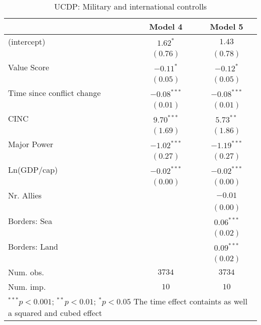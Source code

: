 
\begin{table}
\begin{center}
\begin{tabular}{l c c}
\toprule
 & Model 4 & Model 5 \\
\midrule
(intercept)                & $1.62^{*}$    & $1.43$        \\
                           & $(0.76)$      & $(0.78)$      \\
Value Score                & $-0.11^{*}$   & $-0.12^{*}$   \\
                           & $(0.05)$      & $(0.05)$      \\
Time since conflict change & $-0.08^{***}$ & $-0.08^{***}$ \\
                           & $(0.01)$      & $(0.01)$      \\
CINC                       & $9.70^{***}$  & $5.73^{**}$   \\
                           & $(1.69)$      & $(1.86)$      \\
Major Power                & $-1.02^{***}$ & $-1.19^{***}$ \\
                           & $(0.27)$      & $(0.27)$      \\
Ln(GDP/cap)                & $-0.02^{***}$ & $-0.02^{***}$ \\
                           & $(0.00)$      & $(0.00)$      \\
Nr. Allies                 &               & $-0.01$       \\
                           &               & $(0.00)$      \\
Borders: Sea               &               & $0.06^{***}$  \\
                           &               & $(0.02)$      \\
Borders: Land              &               & $0.09^{***}$  \\
                           &               & $(0.02)$      \\
\midrule
Num. obs.                  & $3734$        & $3734$        \\
Num. imp.                  & $10$          & $10$          \\
\bottomrule
\multicolumn{3}{l}{\scriptsize{$^{***}p<0.001$; $^{**}p<0.01$; $^{*}p<0.05$ 
 The time effect containts as well a squared and cubed effect}}
\end{tabular}
\caption{UCDP: Military and international controlls}
\label{UCDP_2}
\end{center}
\end{table}
